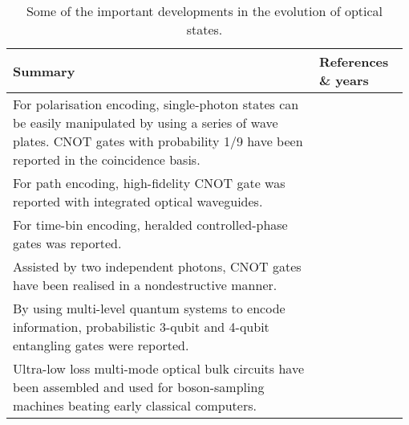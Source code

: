 \begin{table*}[!htbp]
	\begin{tabular}{|p{0.755\linewidth}|p{0.22\linewidth}|}
		\hline
	\textbf{Summary} & \textbf{References \& years} \\	\hline \hline
		For polarisation encoding, single-photon states can be easily manipulated by using a series of wave plates. CNOT gates with probability 1/9 have been reported in the coincidence basis. &  \cite{bib:Brien2003demonstration, bib:Kiesel2005, bib:Langford2005,  bib:Okamoto2005} \\
		\hline
		For path encoding, high-fidelity CNOT gate was reported with integrated optical waveguides. & \cite{bib:politi2008silica} \\
		\hline
		For time-bin encoding, heralded controlled-phase gates was reported. & \cite{bib:Humphreys2013} \\
		\hline
		Assisted by two independent photons, CNOT gates have been realised in a nondestructive manner. & \cite{bib:Bao2007Optical, bib:Zhao2005Experimental} \\
		\hline
		By using multi-level quantum systems to encode information, probabilistic 3-qubit and 4-qubit entangling gates were reported. & \cite{bib:lanyon2009simplifying, bib:starek2016} \\
		\hline
		Ultra-low loss multi-mode optical bulk circuits have been assembled and used for boson-sampling machines beating early classical computers. & \cite{bib:wang2017high, bib:wang2018toward} \\
		\hline
	\end{tabular}
	\captionspacetab \caption{Some of the important developments in the evolution of optical states.} \label{tab:evolutionofstates}
\end{table*}

